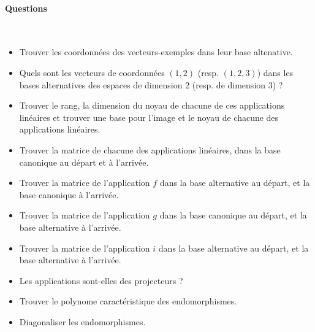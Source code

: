 \documentclass[12pt]{article}
\begin{document}
\newpage

\paragraph{Questions}~\\

\begin{itemize}
\item[1.] Trouver les coordonnées des vecteurs-exemples dans leur base altenative.\\
\item[2.] Quels sont les vecteurs de coordonnées $(1,2)$ (resp. $(1,2,3)$) dans les bases alternatives des espaces de dimension 2 (resp. de dimension 3) ?\\
\item[3.] Trouver le rang, la dimension du noyau de chacune de ces applications linéaires et trouver une base pour l'image et le noyau de chacune des applications linéaires.\\
\item[4.] Trouver la matrice de chacune des applications linéaires, dans la base canonique au départ et à l'arrivée.\\
\item[5.] Trouver la matrice de l'application $f$ dans la base alternative au départ, et la base canonique à l'arrivée.\\
\item[6.] Trouver la matrice de l'application $g$ dans la base canonique au départ, et la base alternative à l'arrivée.\\
\item[7.] Trouver la matrice de l'application $i$ dans la base alternative au départ, et la base alternative à l'arrivée.\\
\item[8.] Les applications sont-elles des projecteurs ?\\
\item[9.] Trouver le polynome caractéristique des endomorphismes.\\
\item[10.] Diagonaliser les endomorphismes.\\
\end{itemize}
\end{document}

